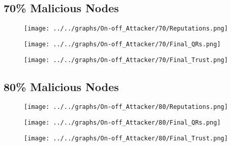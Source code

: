 \begin{minipage}[t]{0.49\columnwidth}
\subsection*{70\% Malicious Nodes}
    \begin{figure}[H]
        \centering
        \texttt{[image: ../../graphs/On-off\_Attacker/70/Reputations.png]}
    \end{figure}
    \begin{figure}[H]
        \centering
        \texttt{[image: ../../graphs/On-off\_Attacker/70/Final\_QRs.png]}
    \end{figure}
\end{minipage}
\begin{minipage}[t]{0.49\columnwidth}
    \begin{figure}[H]
        \centering
        \texttt{[image: ../../graphs/On-off\_Attacker/70/Final\_Trust.png]}
    \end{figure}
\end{minipage}

\begin{minipage}[t]{0.49\columnwidth}
\subsection*{80\% Malicious Nodes}
    \begin{figure}[H]
        \centering
        \texttt{[image: ../../graphs/On-off\_Attacker/80/Reputations.png]}
    \end{figure}
    \begin{figure}[H]
        \centering
        \texttt{[image: ../../graphs/On-off\_Attacker/80/Final\_QRs.png]}
    \end{figure}
\end{minipage}
\begin{minipage}[t]{0.49\columnwidth}
    \begin{figure}[H]
        \centering
        \texttt{[image: ../../graphs/On-off\_Attacker/80/Final\_Trust.png]}
    \end{figure}
\end{minipage}

